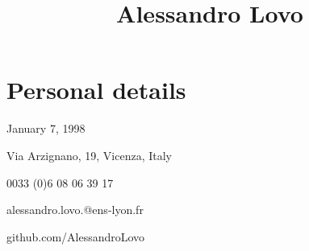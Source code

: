 \documentclass[11pt, a4 paper]{article}
\begin{document}
\title{Alessandro Lovo}
\date{}
\author{}
\maketitle


\section*{Personal details}
  \begin{multicols}{2}
    \begin{description}[style=multiline,leftmargin=2cm,align=right]
      \item[birth] January 7, 1998
      \item[address] Via Arzignano, 19, Vicenza, Italy
      \item[phone] 0033 (0)6 08 06 39 17
      \item[e-mail]
        alessandro.lovo.@ens-lyon.fr

      \item[GitHub] github.com/AlessandroLovo
    \end{description}
  \end{multicols}
\end{document}
